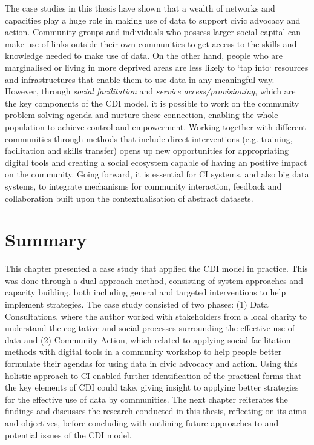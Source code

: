 \noindent
The case studies in this thesis have shown that a wealth of networks \citep{benkler_wealth_2007} and capacities play a huge role in making use of data to support civic advocacy and action. Community groups and individuals who possess larger social capital can make use of links outside their own communities to get access to the skills and knowledge needed to make use of data. On the other hand, people who are marginalised or living in more deprived areas are less likely to `tap into` resources and infrastructures that enable them to use data in any meaningful way. However, through \textit{social facilitation} and \textit{service access/provisioning}, which are the key components of the CDI model, it is possible to work on the community problem-solving agenda and nurture these connection, enabling the whole population to achieve control and empowerment. Working together with different communities through methods that include direct interventions (e.g. training, facilitation and skills transfer) opens up new opportunities for appropriating digital tools and creating a social ecosystem capable of having an positive impact on the community. Going forward, it is essential for CI systems, and also big data systems, to integrate mechanisms for community interaction, feedback and collaboration built upon the contextualisation of abstract datasets.
\clearpage

\section{Summary}
This chapter presented a case study that applied the CDI model in practice. This was done through a dual approach method, consisting of system approaches and capacity building, both including general and targeted interventions to help implement strategies. The case study consisted of two phases: (1) Data Consultations, where the author worked with stakeholders from a local charity to understand the cogitative and social processes surrounding the effective use of data and (2) Community Action, which related to applying social facilitation methods with digital tools in a community workshop to help people better formulate their agendas for using data in civic advocacy and action. Using this holistic approach to CI enabled further identification of the practical forms that the key elements of CDI could take, giving insight to applying better strategies for the effective use of data by communities. The next chapter reiterates the findings and discusses the research conducted in this thesis, reflecting on its aims and objectives, before concluding with outlining future approaches to and potential issues of the CDI model.